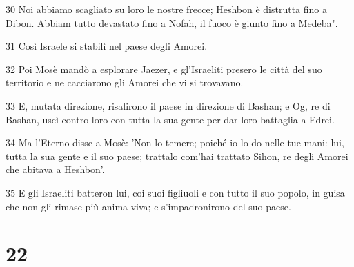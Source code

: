 \par 30 Noi abbiamo scagliato su loro le nostre frecce; Heshbon è distrutta fino a Dibon. Abbiam tutto devastato fino a Nofah, il fuoco è giunto fino a Medeba".
\par 31 Così Israele si stabilì nel paese degli Amorei.
\par 32 Poi Mosè mandò a esplorare Jaezer, e gl'Israeliti presero le città del suo territorio e ne cacciarono gli Amorei che vi si trovavano.
\par 33 E, mutata direzione, risalirono il paese in direzione di Bashan; e Og, re di Bashan, uscì contro loro con tutta la sua gente per dar loro battaglia a Edrei.
\par 34 Ma l'Eterno disse a Mosè: 'Non lo temere; poiché io lo do nelle tue mani: lui, tutta la sua gente e il suo paese; trattalo com'hai trattato Sihon, re degli Amorei che abitava a Heshbon'.
\par 35 E gli Israeliti batteron lui, coi suoi figliuoli e con tutto il suo popolo, in guisa che non gli rimase più anima viva; e s'impadronirono del suo paese.

\chapter{22}

